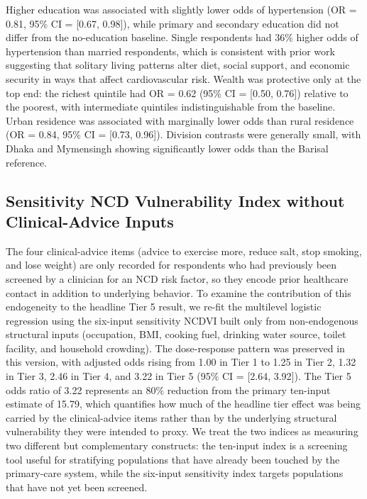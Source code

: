 \documentclass[
  12pt,
  a4paper]{article}
\begin{document}
Higher education was associated with slightly lower odds of hypertension (OR = 0.81, 95\% CI = {[}0.67, 0.98{]}), while primary and secondary education did not differ from the no-education baseline. Single respondents had 36\% higher odds of hypertension than married respondents, which is consistent with prior work suggesting that solitary living patterns alter diet, social support, and economic security in ways that affect cardiovascular risk. Wealth was protective only at the top end: the richest quintile had OR = 0.62 (95\% CI = {[}0.50, 0.76{]}) relative to the poorest, with intermediate quintiles indistinguishable from the baseline. Urban residence was associated with marginally lower odds than rural residence (OR = 0.84, 95\% CI = {[}0.73, 0.96{]}). Division contrasts were generally small, with Dhaka and Mymensingh showing significantly lower odds than the Barisal reference.

\subsection{Sensitivity NCD Vulnerability Index without Clinical-Advice Inputs}\label{sensitivity-ncd-vulnerability-index-without-clinical-advice-inputs}

The four clinical-advice items (advice to exercise more, reduce salt, stop smoking, and lose weight) are only recorded for respondents who had previously been screened by a clinician for an NCD risk factor, so they encode prior healthcare contact in addition to underlying behavior. To examine the contribution of this endogeneity to the headline Tier 5 result, we re-fit the multilevel logistic regression using the six-input sensitivity NCDVI built only from non-endogenous structural inputs (occupation, BMI, cooking fuel, drinking water source, toilet facility, and household crowding). The dose-response pattern was preserved in this version, with adjusted odds rising from 1.00 in Tier 1 to 1.25 in Tier 2, 1.32 in Tier 3, 2.46 in Tier 4, and 3.22 in Tier 5 (95\% CI = {[}2.64, 3.92{]}). The Tier 5 odds ratio of 3.22 represents an 80\% reduction from the primary ten-input estimate of 15.79, which quantifies how much of the headline tier effect was being carried by the clinical-advice items rather than by the underlying structural vulnerability they were intended to proxy. We treat the two indices as measuring two different but complementary constructs: the ten-input index is a screening tool useful for stratifying populations that have already been touched by the primary-care system, while the six-input sensitivity index targets populations that have not yet been screened.
\end{document}
